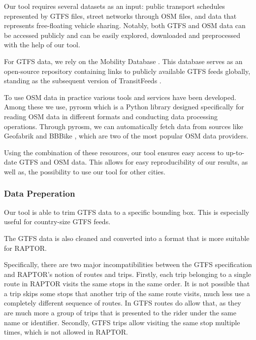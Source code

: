 Our tool requires several datasets as an input: public transport schedules represented by GTFS files, street networks through OSM files, and data that represents free-floating vehicle sharing.
Notably, both GTFS and OSM data can be accessed publicly and can be easily explored, downloaded and preprocessed with the help of our tool.

For GTFS data, we rely on the Mobility Database .
This database serves as an open-source repository containing links to publicly available GTFS feeds globally, standing as the subsequent version of TransitFeeds .

To use OSM data in practice various tools and services have been developed.
Among these we use, pyrosm  which is a Python library designed specifically for reading OSM data in different formats and conducting data processing operations.
Through pyrosm, we can automatically fetch data from sources like Geofabrik \cite{GeofabrikDownloadServer} and BBBike \cite{BBBikeExtractsOpenStreetMap}, which are two of the most popular OSM data providers.

Using the combination of these resources, our tool ensures easy access to up-to-date GTFS and OSM data.
This allows for easy reproducibility of our results, as well as, the possibility to use our tool for other cities.

\subsubsection{Data Preperation}
\label{subs:data_preperation}

Our tool is able to trim GTFS data to a specific bounding box.
This is especially useful for country-size GTFS feeds.

The GTFS data is also cleaned and converted into a format that is more suitable for RAPTOR.

Specifically, there are two major incompatibilities between the GTFS specification and RAPTOR's notion of routes and trips.
Firstly, each trip belonging to a single route in RAPTOR visits the same stops in the same order.
It is not possible that a trip skips some stops that another trip of the same route visits, much less use a completely different sequence of routes.
In GTFS routes do allow that, as they are much more a group of trips that is presented to the rider under the same name or identifier.
Secondly, GTFS trips allow visiting the same stop multiple times, which is not allowed in RAPTOR.

